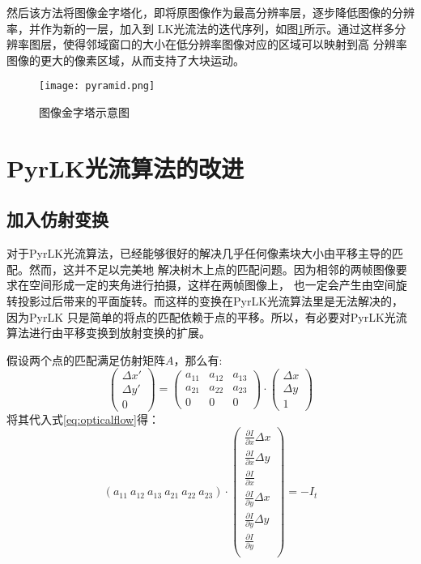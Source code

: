 然后该方法将图像金字塔化，即将原图像作为最高分辨率层，逐步降低图像的分辨率，并作为新的一层，加入到
LK光流法的迭代序列，如图\ref{fig:pyramid}所示。通过这样多分辨率图层，使得邻域窗口的大小在低分辨率图像对应的区域可以映射到高
分辨率图像的更大的像素区域，从而支持了大块运动。

\begin{figure}[H]
	\centering
	\texttt{[image: pyramid.png]}
	\caption{图像金字塔示意图}
	\label{fig:pyramid}
\end{figure}

\section{PyrLK光流算法的改进}
\label{subsec:revisedpyrlk}
\subsection{加入仿射变换}
对于PyrLK光流算法，已经能够很好的解决几乎任何像素块大小由平移主导的匹配。然而，这并不足以完美地
解决树木上点的匹配问题。因为相邻的两帧图像要求在空间形成一定的夹角进行拍摄，这样在两帧图像上，
也一定会产生由空间旋转投影过后带来的平面旋转。而这样的变换在PyrLK光流算法里是无法解决的，因为PyrLK
只是简单的将点的匹配依赖于点的平移。所以，有必要对PyrLK光流算法进行由平移变换到放射变换的扩展。

假设两个点的匹配满足仿射矩阵$A$，那么有:\\
\begin{equation}
	\left(
	\begin{array}{c}
		\Delta x'\\
		\Delta y'\\
		0
	\end{array}
	\right)
	=
	\left(
	\begin{array}{ccc}
		a_{11} & a_{12} & a_{13}\\
		a_{21} & a_{22} & a_{23}\\
				0 & 0 & 0
	\end{array}
	\right)
	\cdot
	\left(
	\begin{array}{c}
		\Delta x\\
		\Delta y\\
		1
	\end{array}
	\right)
\end{equation}
将其代入式\ref{eq:opticalflow}得：\\
\begin{equation}
	(a_{11}\ a_{12}\ a_{13}\ a_{21}\ a_{22}\ a_{23})\cdot
	\left(
	\begin{array}{c}
		\frac{\partial I}{\partial x}\Delta x\\
        \frac{\partial I}{\partial x}\Delta y\\
        \frac{\partial I}{\partial x}\\
        \frac{\partial I}{\partial y}\Delta x\\
        \frac{\partial I}{\partial y}\Delta y\\
        \frac{\partial I}{\partial y}\\
	\end{array}
	\right)
	=-I_t
\end{equation}

